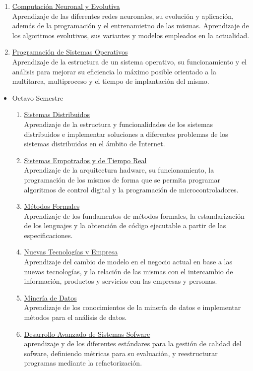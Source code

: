 \begin{itemize}
\begin{enumerate}
\item \underline{Computación Neuronal y Evolutiva}\\Aprendizaje de las diferentes redes neuronales, su evolución y aplicación, además de la programación y el entrenamietno de las mismas. Aprendizaje de los algoritmos evolutivos, sus variantes y modelos empleados en la actualidad. 
\item \underline{Programación de Sistemas Operativos}\\Aprendizaje de la estructura de un sistema operativo, su funcionamiento y el análisis para mejorar su eficiencia lo máximo posible orientado a la multitarea, multiproceso y el tiempo de implantación del mismo. 
\end{enumerate}
\end{itemize}
\begin{itemize}
\item Octavo Semestre
\begin{enumerate}
\item \underline{Sistemas Distribuidos}\\Aprendizaje de la estructura y funcionalidades de los sistemas distribuidos e implementar soluciones a diferentes problemas de los sistemas distribuidos en el ámbito de Internet. 
\item \underline{Sistemas Empotrados y de Tiempo Real}\\Aprendizaje de la arquitectura hadware, su funcionamiento, la programación de los mismos  de forma que se permita programar algoritmos de control digital y la programación de microcontroladores. 
\item \underline{Métodos Formales}\\Aprendizaje de los fundamentos de métodos formales, la estandarización de los lenguajes y la obtención de código ejecutable a partir de las especificaciones. 
\item \underline{Nuevas Tecnologías y Empresa}\\Aprendizaje del cambio de modelo en el negocio actual en base a las nuevas tecnologías, y la relación de las mismas con el intercambio de información, productos y servicios con las empresas y personas. 
\item \underline{Minería de Datos}\\Aprendizaje de los conocimientos de la minería de datos e implementar métodos   para el análisis de datos. 
\item \underline{Desarrollo Avanzado de Sistemas Sofware}\\aprendizaje y de los diferentes estándares para la gestión de calidad del sofware, definiendo métricas para su evaluación,  y reestructurar programas mediante la refactorización. \nocite{ubu:docencia}
\end{enumerate}
\end{itemize}
